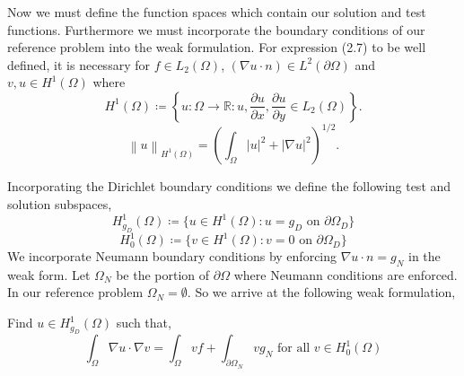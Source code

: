 \documentclass[12 pt]{report}
\newcommand{\RR}{\mathbb{R}}
\newcommand{\norm}[2]{\left \lVert #1 \right \rVert_{#2}}
\newcommand{\abs}[1]{\left| #1 \right|}
\begin{document}
Now we must define the function spaces which contain our solution and test functions. Furthermore we must incorporate the boundary conditions of our reference problem into the weak formulation. For expression (2.7) to be well defined, it is necessary for $f \in L_2(\Omega)$, $(\nabla u \cdot n) \in L^2(\partial \Omega)$ and $v, u \in H^1(\Omega)$ where %
\begin{equation} \label{eq: definitionofSobelevSpace}
  {H}^1(\Omega) \coloneqq \left\{u: \Omega \to \RR: u, \frac{\partial u}{\partial x}, \frac{\partial u}{\partial y} \in L_2(\Omega)\right\}. 
\end{equation}
\begin{equation}
  \norm{u}{H^1(\Omega)} = \left(\int_{\Omega} \abs{u}^2 + \abs{\nabla u}^2\right)^{1/2}.
\end{equation}

Incorporating the Dirichlet boundary conditions we define the following test and solution subspaces, 
\begin{equation} \label{eq test and solution subspaces}
  {H}_{g_D}^1(\Omega) \coloneqq \{u \in {H}^1(\Omega): u = g_D \text{ on } \partial \Omega_D\}
\end{equation}
\begin{equation} \label{eq test and solution subspaces}
  {H}_{0}^1(\Omega) \coloneqq \{v \in {H}^1(\Omega):  v = 0 \text{ on } \partial \Omega_D\}
\end{equation}
We incorporate Neumann boundary conditions by enforcing $\nabla u \cdot n = g_N$ in the weak form. Let $\Omega_N$ be the portion of $\partial\Omega$ where Neumann conditions are enforced. In our reference problem $\Omega_N = \emptyset$. So we arrive at the following weak formulation, 
\begin{mdframed}
  Find $u \in  {H}_{g_D}^1(\Omega) $ such that, 
  \begin{equation}  \label{eq:poisson}
    \int_{\Omega} \nabla u \cdot \nabla v = \int_{\Omega} vf + \int_{\partial\Omega_N} vg_N \text{ for all } v \in {H}_{0}^1(\Omega)
  \end{equation}
\end{mdframed}
\end{document}
